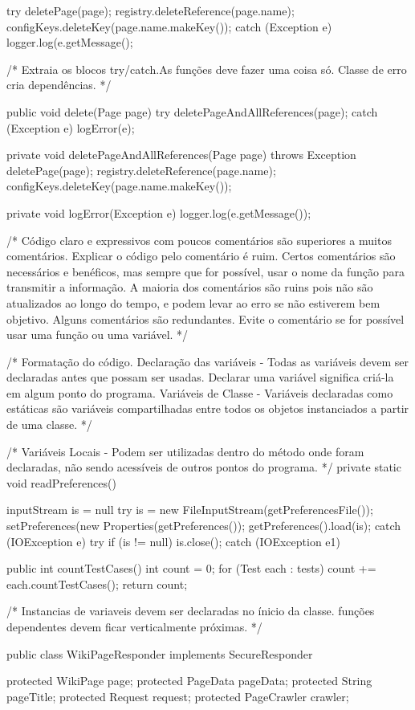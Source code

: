 {{{try {
	deletePage(page);
	registry.deleteReference(page.name);
	configKeys.deleteKey(page.name.makeKey());
}
catch (Exception e){
	logger.log(e.getMessage();
}
	
/*
Extraia os blocos try/catch.As funções deve fazer uma coisa só.
Classe de erro cria dependências.
*/

public void delete(Page page){
	try{
		deletePageAndAllReferences(page);
	}
	catch (Exception e){
		logError(e);
	}
}

private void deletePageAndAllReferences(Page page) throws Exception {
	deletePage(page);
	registry.deleteReference(page.name);
	configKeys.deleteKey(page.name.makeKey());
}

private void logError(Exception e){
	logger.log(e.getMessage());
}

/*
Código claro e expressivos com poucos comentários são superiores a muitos comentários.
Explicar o código pelo comentário é ruim.
Certos comentários são necessários e benéficos, mas sempre que for possível,
usar o nome da função para transmitir a informação.
A maioria dos comentários são ruins pois não são atualizados ao longo do tempo,
e podem levar ao erro se não estiverem bem objetivo.
Alguns comentários são redundantes. 
Evite o comentário se for possível usar uma função ou uma variável.
*/

/*
Formatação do código.
Declaração das variáveis - Todas as variáveis devem ser declaradas antes que possam ser usadas. Declarar uma variável significa criá-la em algum ponto do programa.
Variáveis de Classe - Variáveis declaradas como estáticas são variáveis compartilhadas entre todos os objetos instanciados a partir de uma classe. 
*/

/*
Variáveis Locais - Podem ser utilizadas dentro do método onde foram declaradas, não sendo acessíveis de outros pontos do programa.
*/
private static void readPreferences(){
	inputStream is = null
	try{
		is = new FileInputStream(getPreferencesFile());
		setPreferences(new Properties(getPreferences());
		getPreferences().load(is);
	}catch (IOException e) {
		try{
			if (is != null){
				is.close();
			}catch (IOException e1){
			}
		}
	}

public int countTestCases(){
	int count = 0;
	for (Test each : tests){
		count += each.countTestCases();
	}
	return count;
}

/*
Instancias de variaveis devem ser declaradas no ínicio da classe.
funções dependentes devem ficar verticalmente próximas.
*/

public class WikiPageResponder implements SecureResponder{
	protected WikiPage page;
	protected PageData pageData;
	protected String pageTitle;
	protected Request request;
	protected PageCrawler crawler;
	
}}}}}
